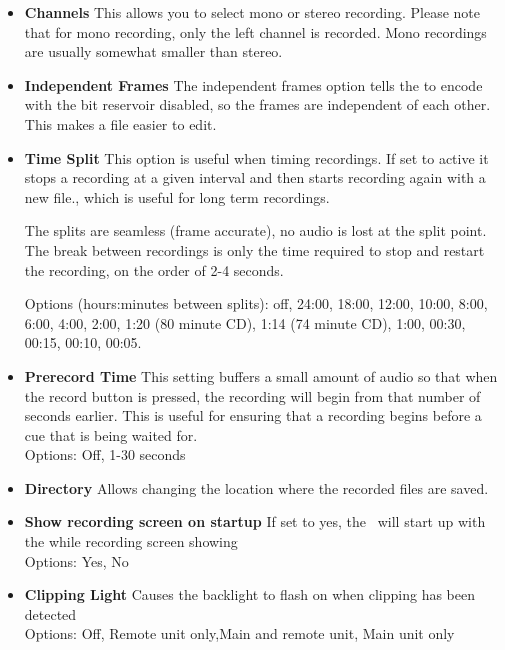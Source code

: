 {\begin{itemize}
    Note: you cannot change the sample rate for digital recordings.
    
  \item \textbf{Channels}
    This allows you to select mono or stereo recording. Please note that for mono recording, only the left channel is recorded.  Mono recordings are usually somewhat smaller than stereo.
    
  \item \textbf{Independent Frames}
    The independent frames option tells the \dap to encode with the bit reservoir disabled, so the frames are independent of each other. This makes a file easier to edit.
    
  \item \textbf{Time Split}
    This option is useful when timing recordings. If set to active it stops a recording at a given interval and then starts recording again with a new file., which is useful for long term recordings.
    
    The splits are seamless (frame accurate), no audio is lost at the split point. The break between recordings is only the time required to stop and restart the recording, on the order of 2{}-4 seconds.
    
    Options (hours:minutes between splits): off, 24:00, 18:00, 12:00, 10:00, 8:00, 6:00, 4:00, 2:00, 1:20 (80 minute CD), 1:14 (74 minute  CD), 1:00, 00:30, 00:15, 00:10, 00:05.
    
  \item \textbf{Prerecord Time}
    This setting buffers a small amount of audio so that when the record button is pressed, the recording will begin from that number of seconds earlier. This is useful for ensuring that a recording begins before a cue that is being waited for.\\
    Options: Off, 1{}-30 seconds\\
    
  \item \textbf{Directory}
    Allows changing the location where the recorded files are saved.\\
    
  \item \textbf{Show recording screen on startup}
    If set to yes, the \dap\ will start up with the while recording screen showing\\
    Options: Yes, No\\
    
  \item \textbf{Clipping Light}
    Causes the backlight to flash on when clipping has been detected\\
    Options: Off, Remote unit only,Main and remote unit, Main unit only\\
    
  \end{itemize}
}

